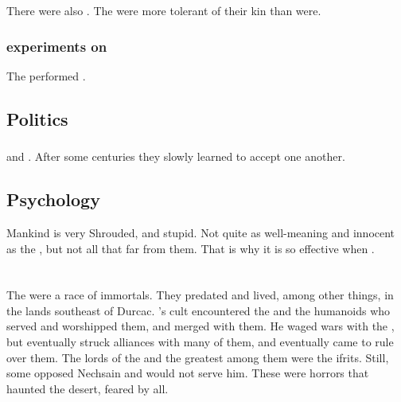 There were also .
The \scathae were more tolerant of their kin than \humans were. 





\subsubsection{\Resphan experiments on \humans}
The \resphain performed . 









\subsection{Politics}





\subsubsection{\Scathae}
\Scathae and \humans {}.
After some centuries they slowly learned to accept one another. 









\subsection{Psychology}
Mankind is very Shrouded, \naive{} and stupid. 
Not quite as well-meaning and {innocent} as the \scathae, but not all that far from them.
That is why it is so effective when . 















\section{\Jinni}
\index{\jinni}
The \jinn were a race of immortals.
They predated \humans and lived, among other things, in the lands southeast of Durcac. 
\Secherdamon's cult encountered the \jinn and the humanoids who served and worshipped them, and merged with them.
He waged wars with the \jinn, but eventually struck alliances with many of them, and eventually came to rule over them.
The lords of the \jinn and the greatest among them were the ifrits.
Still, some \jinn opposed Nechsain and would not serve him. 
These  \jinn were horrors that haunted the desert, feared by all.

